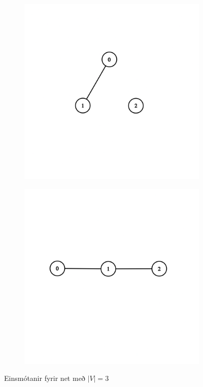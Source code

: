 \documentclass[12pt, a4paper, hidelinks]{article}
\begin{document}
\begin{figure}[H]
    \centering
    \begin{subfigure}[b]{0.45\textwidth}
        \includegraphics[width=\textwidth]{graph_v3_3.png}
    \end{subfigure}
    \begin{subfigure}[b]{0.45\textwidth}
        \includegraphics[width=\textwidth]{graph_v3_4.png}
    \end{subfigure}
    \caption{Einsmótanir fyrir net með $|V| = 3$}
\end{figure}
\end{document}

